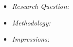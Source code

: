 \section{\large \protect\bibentry{} \cite{}}
    \begin{itemize}
        \item \textit{Research Question:} \cmt{}
        \item \textit{Methodology:}
        \item \textit{Impressions:}
    \end{itemize}